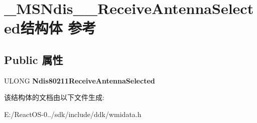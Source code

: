 \hypertarget{struct___m_s_ndis__80211___receive_antenna_selected}{}\section{\+\_\+\+M\+S\+Ndis\+\_\+\_\+\+Receive\+Antenna\+Selected结构体 参考}
\label{struct___m_s_ndis__80211___receive_antenna_selected}
\subsection*{Public 属性}
\begin{DoxyCompactItemize}
\item 
\mbox{\label{struct___m_s_ndis__80211___receive_antenna_selected_acc69068aa0d8306d82f7c09e9efb62ce}} 
U\+L\+O\+NG {\bfseries Ndis80211\+Receive\+Antenna\+Selected}
\end{DoxyCompactItemize}


该结构体的文档由以下文件生成\+:\begin{DoxyCompactItemize}
\item 
E\+:/\+React\+O\+S-\/0../sdk/include/ddk/wmidata.\+h\end{DoxyCompactItemize}
